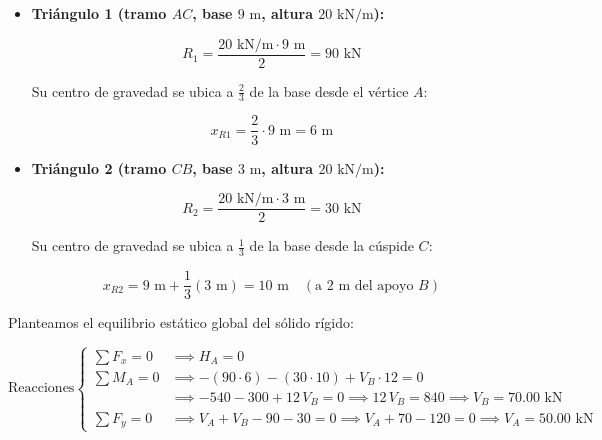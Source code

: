 \begin{itemize}

    \item \textbf{Triángulo 1 (tramo $AC$, base $9\text{ m}$, altura $20\text{ kN/m}$):}

          \[

              R_1 = \frac{20\text{ kN/m} \cdot 9\text{ m}}{2} = 90\text{ kN}

          \]

          Su centro de gravedad se ubica a $\frac{2}{3}$ de la base desde el vértice $A$:

          \[

              x_{R1} = \frac{2}{3} \cdot 9\text{ m} = 6\text{ m}

          \]

    \item \textbf{Triángulo 2 (tramo $CB$, base $3\text{ m}$, altura $20\text{ kN/m}$):}

          \[

              R_2 = \frac{20\text{ kN/m} \cdot 3\text{ m}}{2} = 30\text{ kN}

          \]

          Su centro de gravedad se ubica a $\frac{1}{3}$ de la base desde la cúspide $C$:

          \[

              x_{R2} = 9\text{ m} + \frac{1}{3}(3\text{ m}) = 10\text{ m} \quad (\text{a } 2\text{ m del apoyo } B)

          \]

\end{itemize}



Planteamos el equilibrio estático global del sólido rígido:

\begin{equation}

    \text{Reacciones} \left\{

    \begin{aligned}

        \sum F_x = 0 & \implies \boxed{H_A = 0}                                                                            \\[6pt]

        \sum M_A = 0 & \implies -(90 \cdot 6) - (30 \cdot 10) + V_B \cdot 12 = 0                                           \\

                     & \implies -540 - 300 + 12\,V_B = 0 \implies 12\,V_B = 840 \implies \boxed{V_B = 70.00\text{ kN}}     \\[6pt]

        \sum F_y = 0 & \implies V_A + V_B - 90 - 30 = 0 \implies V_A + 70 - 120 = 0 \implies \boxed{V_A = 50.00\text{ kN}}

    \end{aligned}

    \right.

\end{equation}



